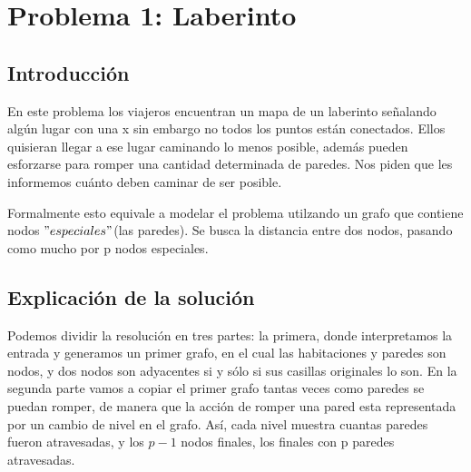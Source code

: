 \documentclass[spanish,12pt]{article}
\begin{document}
\author{Grupo  \\Alvarez Vico Jazm\'in\\Cortés Conde Titó Javier María\\Pedraza Marcelo \\ Rozenberg Uriel Jonathan}


\maketitle


\clearpage

\tableofcontents
\cleardoublepage

\section{Problema 1: Laberinto}

\subsection{Introducción}

En este problema los viajeros encuentran un mapa de un laberinto señalando algún lugar con una x sin embargo no todos los puntos están conectados. Ellos quisieran llegar a ese lugar caminando lo menos posible, además pueden esforzarse para romper una cantidad determinada de paredes. Nos piden que les informemos cuánto deben caminar de ser posible.

Formalmente esto equivale a modelar el problema utilzando un grafo que contiene nodos $"especiales"$(las paredes). Se busca la distancia entre dos nodos, pasando como mucho por p nodos especiales.

\subsection{Explicación de la solución}
Podemos dividir la resolución en tres partes: la primera, donde interpretamos la entrada y generamos un primer grafo, en el cual las habitaciones y paredes son nodos, y dos nodos son adyacentes si y sólo si sus casillas originales lo son. En la segunda parte vamos a copiar el primer grafo tantas veces como paredes se puedan romper, de manera que la acción de romper una pared esta representada por un cambio de nivel en el grafo. Así, cada nivel muestra cuantas paredes fueron atravesadas, y los $p-1$ nodos finales, los finales con p paredes atravesadas.
\end{document}
